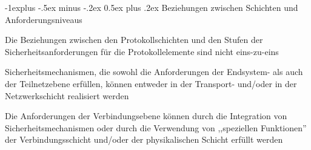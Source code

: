 \documentclass[a4paper]{article}
\makeatletter
\renewcommand{\subsection}{\@startsection{subsection}{2}{0mm}%
 {-1explus -.5ex minus -.2ex}%
 {0.5ex plus .2ex}%
 {\normalfont\normalsize\bfseries}}
\makeatother
\begin{document}
\begin{multicols}{3}
      \subsection{Beziehungen zwischen Schichten und Anforderungsniveaus}
      \begin{itemize*}
            \item Die Beziehungen zwischen den Protokollschichten und den Stufen der Sicherheitsanforderungen für die Protokollelemente sind nicht eins-zu-eins
            \item Sicherheitsmechanismen, die sowohl die Anforderungen der Endsystem- als auch der Teilnetzebene erfüllen, können entweder in der Transport- und/oder in der Netzwerkschicht realisiert werden
            \item Die Anforderungen der Verbindungsebene können durch die Integration von Sicherheitsmechanismen oder durch die Verwendung von ,,speziellen Funktionen'' der Verbindungsschicht und/oder der physikalischen Schicht erfüllt werden
      \end{itemize*}


\end{multicols}
\end{document}
